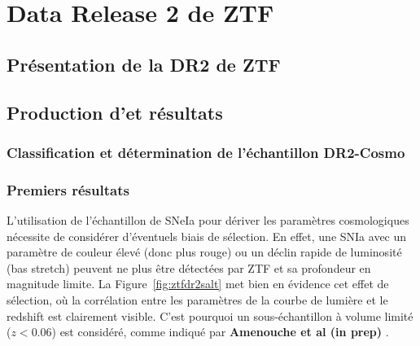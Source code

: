\documentclass[../main/main.tex]{subfiles}
\begin{document}
\chapter{Data Release 2 de ZTF}\label{ch:res}

\minitoc
\newpage

\section{Présentation de la DR2 de ZTF}

\section{Production d'\hypergal et résultats}

\subsection{Classification et détermination de l'échantillon DR2-Cosmo}

\subsection{Premiers résultats}

L'utilisation de l'échantillon de SNeIa pour dériver les paramètres
cosmologiques nécessite de considérer d'éventuels biais de sélection. En
effet, une SNIa avec un paramètre de couleur élevé (donc plus rouge) ou
un déclin rapide de luminosité (bas stretch) peuvent ne plus être détectées
par ZTF et sa profondeur en magnitude limite. La
Figure~\ref{fig:ztfdr2salt} met bien en évidence cet effet de sélection,
où la corrélation entre les paramètres de la courbe de lumière et le
redshift est clairement visible. C'est pourquoi un sous-échantillon à
volume limité ($z<0.06$) est considéré, comme indiqué par \textbf{Amenouche et al (in prep)} .
\end{document}
